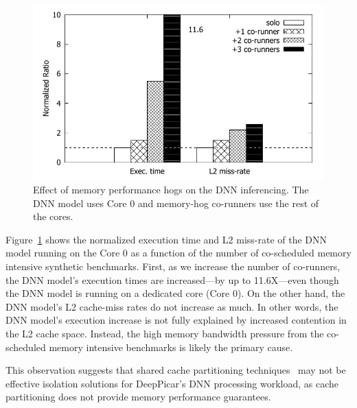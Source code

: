 \begin{figure}[h]
  \centering
  \includegraphics[width=.7\textwidth]{figs/perf_vs_bandwidth}
  \caption{Effect of memory performance hogs on the DNN
    inferencing. The DNN model uses Core 0 and memory-hog co-runners
    use the rest of the cores.}
  \label{fig:}
\end{figure}

Figure~\ref{fig:} shows the normalized execution time and L2 miss-rate
of the DNN model running on the Core 0 as a function of the number of
co-scheduled memory intensive synthetic benchmarks. First, as we
increase the number of co-runners, the DNN model's execution times are
increased---by up to 11.6X---even though the DNN model is running on a
dedicated core (Core 0). On the other hand, the DNN model's L2
cache-miss rates do not increase as much.
In other words, the DNN model's execution increase is not fully
explained by increased contention in the L2 cache space.
Instead, the high memory bandwidth pressure from the co-scheduled
memory intensive benchmarks is likely the primary cause.


This observation suggests that shared cache partitioning
techniques~\cite{Gracioli2015,Kim2016} may not be effective isolation
solutions for DeepPicar's DNN processing workload, as cache
partitioning does not provide memory performance guarantees.


